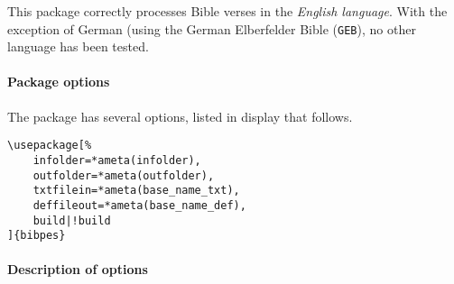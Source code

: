 \documentclass{article}
\begin{document}
    This package correctly processes Bible verses in the \emph{English language}. With the exception
    of German (using the German Elberfelder Bible (\texttt{GEB}), no other language has been tested.

    \paragraph*{Package options} The package has several options, listed in display that follows.
\begin{Verbatim}[xleftmargin=\amtIndent,commandchars=*()]
\usepackage[%
    infolder=*ameta(infolder),
    outfolder=*ameta(outfolder),
    txtfilein=*ameta(base_name_txt),
    deffileout=*ameta(base_name_def),
    build|!build
]{bibpes}
\end{Verbatim}
\paragraph*{Description of options}
\end{document}
